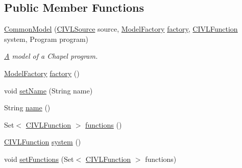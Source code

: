\subsection*{Public Member Functions}
\begin{DoxyCompactItemize}
\item 
\hyperlink{classedu_1_1udel_1_1cis_1_1vsl_1_1civl_1_1model_1_1common_1_1CommonModel_a2858c6739670ccdebd01098f067c04ba}{Common\+Model} (\hyperlink{interfaceedu_1_1udel_1_1cis_1_1vsl_1_1civl_1_1model_1_1IF_1_1CIVLSource}{C\+I\+V\+L\+Source} source, \hyperlink{interfaceedu_1_1udel_1_1cis_1_1vsl_1_1civl_1_1model_1_1IF_1_1ModelFactory}{Model\+Factory} \hyperlink{classedu_1_1udel_1_1cis_1_1vsl_1_1civl_1_1model_1_1common_1_1CommonModel_a6eaf75e306ea96a8518c76d3c3902a17}{factory}, \hyperlink{interfaceedu_1_1udel_1_1cis_1_1vsl_1_1civl_1_1model_1_1IF_1_1CIVLFunction}{C\+I\+V\+L\+Function} system, Program program)
\begin{DoxyCompactList}\small\item\em \hyperlink{structA}{A} model of a Chapel program. \end{DoxyCompactList}\item 
\hyperlink{interfaceedu_1_1udel_1_1cis_1_1vsl_1_1civl_1_1model_1_1IF_1_1ModelFactory}{Model\+Factory} \hyperlink{classedu_1_1udel_1_1cis_1_1vsl_1_1civl_1_1model_1_1common_1_1CommonModel_a6eaf75e306ea96a8518c76d3c3902a17}{factory} ()
\item 
void \hyperlink{classedu_1_1udel_1_1cis_1_1vsl_1_1civl_1_1model_1_1common_1_1CommonModel_a20bc73659841f0a126892cf755d6e737}{set\+Name} (String name)
\item 
String \hyperlink{classedu_1_1udel_1_1cis_1_1vsl_1_1civl_1_1model_1_1common_1_1CommonModel_af9d9b51a869ee154fdfac68d6f93112c}{name} ()
\item 
Set$<$ \hyperlink{interfaceedu_1_1udel_1_1cis_1_1vsl_1_1civl_1_1model_1_1IF_1_1CIVLFunction}{C\+I\+V\+L\+Function} $>$ \hyperlink{classedu_1_1udel_1_1cis_1_1vsl_1_1civl_1_1model_1_1common_1_1CommonModel_a5d7f394df1bc74b2c1d258d737afb0b2}{functions} ()
\item 
\hyperlink{interfaceedu_1_1udel_1_1cis_1_1vsl_1_1civl_1_1model_1_1IF_1_1CIVLFunction}{C\+I\+V\+L\+Function} \hyperlink{classedu_1_1udel_1_1cis_1_1vsl_1_1civl_1_1model_1_1common_1_1CommonModel_a68f14521d07f7e57efb531429f451909}{system} ()
\item 
void \hyperlink{classedu_1_1udel_1_1cis_1_1vsl_1_1civl_1_1model_1_1common_1_1CommonModel_a2e821f22fb18d56eb5c48764314fc276}{set\+Functions} (Set$<$ \hyperlink{interfaceedu_1_1udel_1_1cis_1_1vsl_1_1civl_1_1model_1_1IF_1_1CIVLFunction}{C\+I\+V\+L\+Function} $>$ functions)

\end{DoxyCompactItemize}
